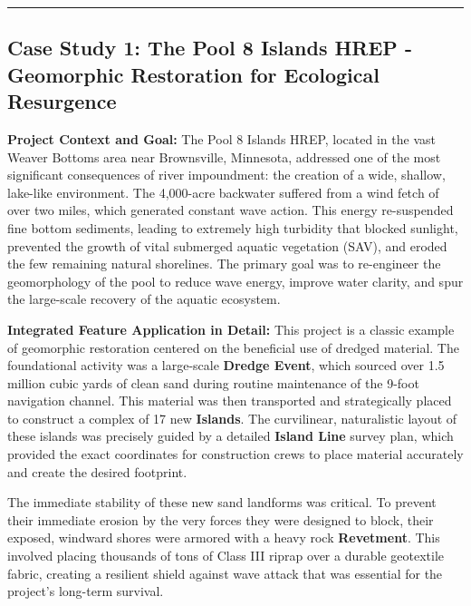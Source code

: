 \documentclass[
  letterpaper,
  DIV=11,
  numbers=noendperiod]{scrreprt}
\begin{document}
\begin{center}\rule{0.5\linewidth}{0.5pt}\end{center}

\subsection{\texorpdfstring{\textbf{Case Study 1: The Pool 8 Islands
HREP - Geomorphic Restoration for Ecological
Resurgence}}{Case Study 1: The Pool 8 Islands HREP - Geomorphic Restoration for Ecological Resurgence}}\label{case-study-1-the-pool-8-islands-hrep---geomorphic-restoration-for-ecological-resurgence}

\textbf{Project Context and Goal:} The Pool 8 Islands HREP, located in
the vast Weaver Bottoms area near Brownsville, Minnesota, addressed one
of the most significant consequences of river impoundment: the creation
of a wide, shallow, lake-like environment. The 4,000-acre backwater
suffered from a wind fetch of over two miles, which generated constant
wave action. This energy re-suspended fine bottom sediments, leading to
extremely high turbidity that blocked sunlight, prevented the growth of
vital submerged aquatic vegetation (SAV), and eroded the few remaining
natural shorelines. The primary goal was to re-engineer the
geomorphology of the pool to reduce wave energy, improve water clarity,
and spur the large-scale recovery of the aquatic ecosystem.

\textbf{Integrated Feature Application in Detail:} This project is a
classic example of geomorphic restoration centered on the beneficial use
of dredged material. The foundational activity was a large-scale
\textbf{Dredge Event}, which sourced over 1.5 million cubic yards of
clean sand during routine maintenance of the 9-foot navigation channel.
This material was then transported and strategically placed to construct
a complex of 17 new \textbf{Islands}. The curvilinear, naturalistic
layout of these islands was precisely guided by a detailed
\textbf{Island Line} survey plan, which provided the exact coordinates
for construction crews to place material accurately and create the
desired footprint.

The immediate stability of these new sand landforms was critical. To
prevent their immediate erosion by the very forces they were designed to
block, their exposed, windward shores were armored with a heavy rock
\textbf{Revetment}. This involved placing thousands of tons of Class III
riprap over a durable geotextile fabric, creating a resilient shield
against wave attack that was essential for the project's long-term
survival.
\end{document}
